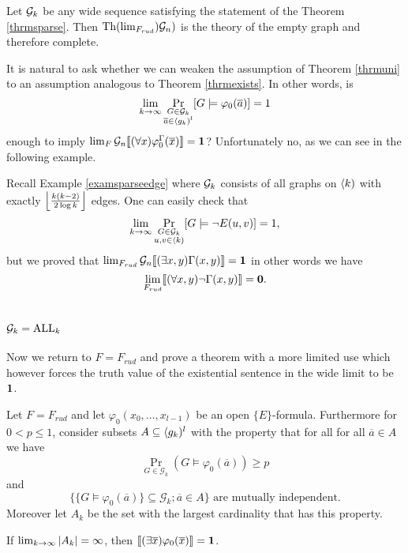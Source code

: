 \begin{crll}\label{crlltoosparse}
Let $\mathcal{G}_k$ be any wide sequence satisfying the statement of the Theorem \ref{thrmsparse}. Then $\text{Th}(\lim_{F_{rud}})\mathcal{G}_n)$ is the theory of the empty graph and therefore complete. 
\end{crll}

It is natural to ask whether we can weaken the assumption of Theorem \ref{thrmuni} to an assumption analogous to Theorem \ref{thrmexists}. In other words, is
\[\lim_{k\to\infty}\Pr_{\substack{G\in\mathcal{G}_k\\\overline a\in \langle g_k)^l}}[G\models\varphi_0(\overline a)]=1\]
enough to imply $\lim_F\mathcal{G}_n\llbracket(\forall x)\varphi_0^\Gamma(\overline x)\rrbracket=\textbf{1}$? Unfortunately no, as we can see in the following example.

\begin{exam}Recall Example \ref{examsparseedge} where $\mathcal{G}_k$ consists of all graphs on $\langle k)$ with exactly $\left \lfloor {\frac{k(k-2)}{2\log k}} \right \rfloor$ edges. One can easily check that
\[\lim_{k\to\infty}\Pr_{\substack{G\in\mathcal{G}_k\\u,v \in \langle k)}}[G\models \lnot E(u,v)]=1,\]
but we proved that $\lim_{F_{rud}}\mathcal{G}_n \llbracket(\exists x,y)\Gamma(x,y)\rrbracket=\textbf{1}$ in other words we have \[\lim_{F_{rud}}\llbracket(\forall x,y)\lnot \Gamma(x,y)\rrbracket=\textbf{0}.\]
\end{exam}

\section{$\mathcal{G}_k=\text{ALL}_k$}

Now we return to $F=F_{rud}$ and prove a theorem with a more limited use which however forces the truth value of the existential sentence in the wide limit to be $\textbf{1}$.

\begin{thrm}\label{mutindfind}
Let $F=F_{rud}$ and let $\varphi_0(x_0,\dots,x_{l-1})$ be an open $\{E\}$-formula. Furthermore for $0<p\leq 1$, consider subsets $A\subseteq\langle g_k)^l$ with the property that for all for all $\overline a \in A$ we have
\[\Pr_{G\in\mathcal{G}_k}(G\models \varphi_0(\overline a))\geq p\]
and
\[\text{$\{\{G\models\varphi_0(\overline a)\}\subseteq \mathcal{G}_k;\overline a \in A\}$ are mutually independent.}\]
Moreover let $A_k$ be the set with the largest cardinality that has this property.

If $\lim_{k\to\infty} \left|{A_k}\right|=\infty$, then $\llbracket(\exists \overline x)\varphi_0(\overline x)\rrbracket=\textbf{1}$.
\end{thrm}

